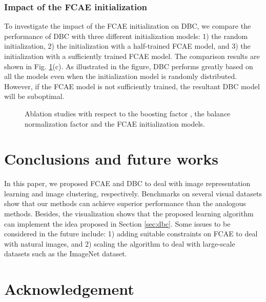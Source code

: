 \documentclass[preprint,12pt]{elsarticle}
\begin{document}
\subsubsection{Impact of the FCAE initialization}

To investigate the impact of the FCAE initialization on DBC, we compare the performance of DBC with three different initialization models: 1) the random initialization, 2) the initialization with a half-trained FCAE model, and
3) the initialization with a sufficiently trained FCAE model. The comparison results are shown in
Fig. \ref{fig:ablations}(c). As illustrated in the figure, DBC performs greatly based on all the models
even when the initialization model is randomly distributed. However, if the FCAE model is not sufficiently
trained, the resultant DBC model will be suboptimal.

\begin{figure}[!thb]
\centering
{}
\caption{Ablation studies with respect to the boosting factor , the balance normalization factor 
and the FCAE initialization models.}\label{fig:ablations}
\end{figure}


\section{Conclusions and future works}
\label{sec:conclusion}


In this paper, we proposed FCAE and DBC to deal with image representation learning and image clustering, respectively. Benchmarks on several visual datasets show that our methods can achieve superior performance than the analogous methods.
Besides, the visualization shows that the proposed learning algorithm can implement the idea proposed in
Section \ref{sec:dbc}. Some issues to be considered in the future include: 1) adding suitable constraints on FCAE
to deal with natural images, and 2) scaling the algorithm to deal with large-scale datasets such as the ImageNet dataset.


\section*{Acknowledgement}
\end{document}
